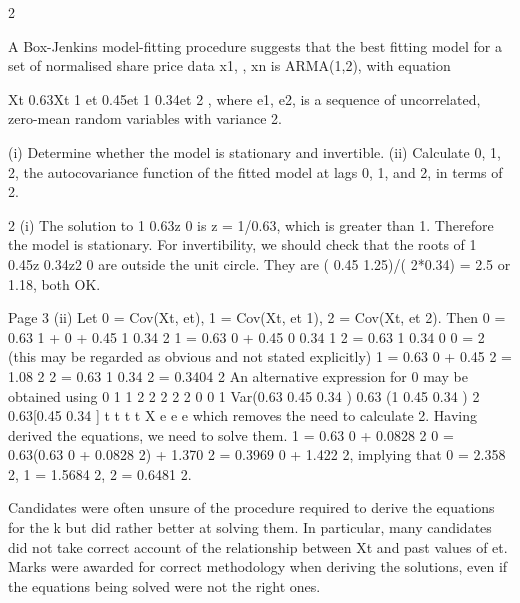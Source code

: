 \documentclass[a4paper,12pt]{article}
\begin{document}
2 

\large 
A Box-Jenkins model-fitting procedure suggests that the best fitting model for a set of normalised share price data x1, , xn is ARMA(1,2), with equation

Xt 0.63Xt 1 et 0.45et 1 0.34et 2 ,
where {e1, e2, } is a sequence of uncorrelated, zero-mean random variables with
variance 2.

(i) Determine whether the model is stationary and invertible. 
(ii) Calculate 0, 1, 2, the autocovariance function of the fitted model at lags 0, 1, and 2, in terms of 2. 


2 (i) The solution to 1 0.63z 0 is z = 1/0.63, which is greater than 1. Therefore the model is stationary.
For invertibility, we should check that the roots of 1 0.45z 0.34z2 0 are outside the unit circle. They are ( 0.45 1.25)/( 2*0.34) = 2.5 or 1.18, both OK.

Page 3
(ii) Let 0 = Cov(Xt, et), 1 = Cov(Xt, et 1), 2 = Cov(Xt, et 2). Then
0 = 0.63 1 + 0 + 0.45 1 0.34 2
1 = 0.63 0 + 0.45 0 0.34 1
2 = 0.63 1 0.34 0
0 = 2 (this may be regarded as obvious and not stated explicitly)
1 = 0.63 0 + 0.45 2 = 1.08 2
2 = 0.63 1 0.34 2 = 0.3404 2
An alternative expression for 0 may be obtained using
0 1 1 2
2 2 2 2
0 0 1
Var(0.63 0.45 0.34 )
0.63 (1 0.45 0.34 ) 2 0.63[0.45 0.34 ]
t t t t X e e e
which removes the need to calculate 2.
Having derived the equations, we need to solve them.
1 = 0.63 0 + 0.0828 2
0 = 0.63(0.63 0 + 0.0828 2) + 1.370 2 = 0.3969 0 + 1.422 2,
implying that
0 = 2.358 2, 1 = 1.5684 2, 2 = 0.6481 2.
\newpage

Candidates were often unsure of the procedure required to derive the equations for the k but did rather better at solving them. In particular, many candidates did not take correct account of the relationship between Xt and past values of et. Marks were awarded for correct methodology when deriving the solutions, even if the equations being solved were not the
right ones.
\end{document}
